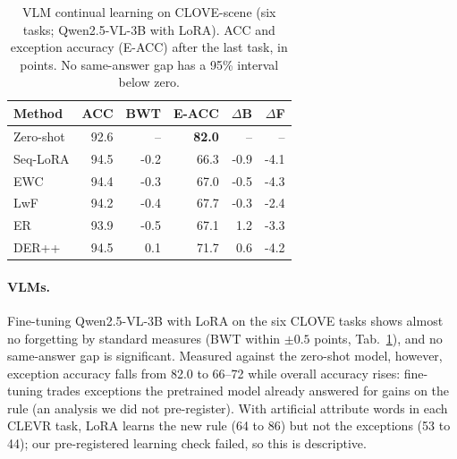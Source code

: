 \begin{table}[t]
\centering\small\setlength{\tabcolsep}{4pt}
\caption{VLM continual learning on CLOVE-scene (six tasks; Qwen2.5-VL-3B with LoRA). ACC and exception accuracy (E-ACC)
after the last task, in points. No same-answer gap has a 95\% interval below zero.}
\label{tab:vlm_cl}
\begin{tabular}{lrrrrr}
\toprule
Method & ACC & BWT & E-ACC & $\Delta$B & $\Delta$F \\
\midrule
Zero-shot & 92.6 & -- & \textbf{82.0} & -- & -- \\
Seq-LoRA  & 94.5 & -0.2 & 66.3 & -0.9 & -4.1 \\
EWC       & 94.4 & -0.3 & 67.0 & -0.5 & -4.3 \\
LwF       & 94.2 & -0.4 & 67.7 & -0.3 & -2.4 \\
ER        & 93.9 & -0.5 & 67.1 & 1.2 & -3.3 \\
DER++     & 94.5 & 0.1 & 71.7 & 0.6 & -4.2 \\
\bottomrule
\end{tabular}
\end{table}

\paragraph{VLMs.}
Fine-tuning Qwen2.5-VL-3B with LoRA on the six CLOVE tasks shows almost no forgetting by standard measures (BWT within
$\pm0.5$ points, Tab.~\ref{tab:vlm_cl}), and no same-answer gap is significant. Measured against the zero-shot model,
however, exception accuracy falls from 82.0 to 66--72 while overall accuracy rises: fine-tuning trades exceptions the
pretrained model already answered for gains on the rule (an analysis we did not pre-register). With artificial
attribute words in each CLEVR task, LoRA learns the new rule (64 to 86) but not the exceptions (53 to 44); our
pre-registered learning check failed, so this is descriptive.

